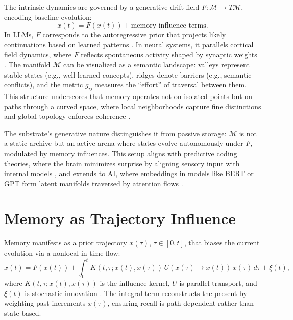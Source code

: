 \documentclass[a4paper,12pt]{article}
\newcommand{\M}{\mathcal{M}}
\begin{document}
The intrinsic dynamics are governed by a generative drift field $F: \M \to T\M$, encoding baseline evolution:
\[
\dot{x}(t) = F(x(t)) + \text{memory influence terms}.
\]
In LLMs, $F$ corresponds to the autoregressive prior that projects likely continuations based on learned patterns \citep{vaswani2017attention}. In neural systems, it parallels cortical field dynamics, where $F$ reflects spontaneous activity shaped by synaptic weights \citep{amari1977dynamics}. The manifold $\M$ can be visualized as a semantic landscape: valleys represent stable states (e.g., well-learned concepts), ridges denote barriers (e.g., semantic conflicts), and the metric $g_{ij}$ measures the ``effort'' of traversal between them. This structure underscores that memory operates not on isolated points but on paths through a curved space, where local neighborhoods capture fine distinctions and global topology enforces coherence \citep{heusser2018geometric}.

The substrate's generative nature distinguishes it from passive storage: $\M$ is not a static archive but an active arena where states evolve autonomously under $F$, modulated by memory influences. This setup aligns with predictive coding theories, where the brain minimizes surprise by aligning sensory input with internal models \citep{friston2010free}, and extends to AI, where embeddings in models like BERT or GPT form latent manifolds traversed by attention flows \citep{devlin2019bert}.

\section{Memory as Trajectory Influence}
Memory manifests as a prior trajectory $x(\tau)$, $\tau \in [0,t]$, that biases the current evolution via a nonlocal-in-time flow:
\[
\dot{x}(t) = F(x(t)) + \int_0^t K(t,\tau; x(t), x(\tau)) \, U(x(\tau) \to x(t)) \, \dot{x}(\tau) \, d\tau + \xi(t),
\]
where $K(t,\tau; x(t), x(\tau))$ is the influence kernel, $U$ is parallel transport, and $\xi(t)$ is stochastic innovation \citep{ritter2023generative}. The integral term reconstructs the present by weighting past increments $\dot{x}(\tau)$, ensuring recall is path-dependent rather than state-based.
\end{document}
